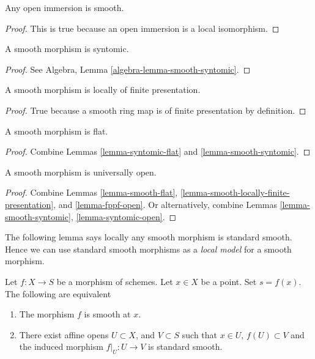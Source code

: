 \begin{lemma}
\label{lemma-open-immersion-smooth}
Any open immersion is smooth.
\end{lemma}

\begin{proof}
This is true because an open immersion is a local isomorphism.
\end{proof}

\begin{lemma}
\label{lemma-smooth-syntomic}
A smooth morphism is syntomic.
\end{lemma}

\begin{proof}
See Algebra, Lemma \ref{algebra-lemma-smooth-syntomic}.
\end{proof}

\begin{lemma}
\label{lemma-smooth-locally-finite-presentation}
A smooth morphism is locally of finite presentation.
\end{lemma}

\begin{proof}
True because a smooth ring map is of finite presentation by
definition.
\end{proof}

\begin{lemma}
\label{lemma-smooth-flat}
A smooth morphism is flat.
\end{lemma}

\begin{proof}
Combine Lemmas \ref{lemma-syntomic-flat} and \ref{lemma-smooth-syntomic}.
\end{proof}

\begin{lemma}
\label{lemma-smooth-open}
A smooth morphism is universally open.
\end{lemma}

\begin{proof}
Combine
Lemmas \ref{lemma-smooth-flat},
\ref{lemma-smooth-locally-finite-presentation}, and
\ref{lemma-fppf-open}.
Or alternatively, combine
Lemmas \ref{lemma-smooth-syntomic},
\ref{lemma-syntomic-open}.
\end{proof}

\noindent
The following lemma says locally any smooth morphism is standard smooth.
Hence we can use standard smooth morphisms as a {\it local model}
for a smooth morphism.

\begin{lemma}
\label{lemma-smooth-locally-standard-smooth}
Let $f : X  \to S$ be a morphism of schemes.
Let $x \in X$ be a point.
Set $s = f(x)$.
The following are equivalent
\begin{enumerate}
\item The morphism $f$ is smooth at $x$.
\item There exist affine opens $U \subset X$,
and $V \subset S$ such that $x \in U$, $f(U) \subset V$ and the
induced morphism $f|_U : U \to V$ is standard smooth.
\end{enumerate}
\end{lemma}

